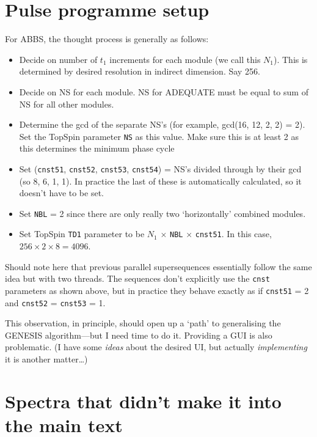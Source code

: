 \documentclass[a4paper,12pt]{article}
\newcommand{\todo}[1]{{\color{OrangeRed}#1}}
\begin{document}
\begin{refsection}
\startcontents[si]
\vfill
\hspace{0pt}
\newpage

\section{Pulse programme setup}

For ABBS, the thought process is generally as follows:

\begin{itemize}
    \item Decide on number of $t_1$ increments for each module (we call this $N_1$). This is determined by desired resolution in indirect dimension. Say 256.
    \item Decide on NS for each module. NS for ADEQUATE must be equal to sum of NS for all other modules.
    \item Determine the gcd of the separate NS's (for example, gcd(16, 12, 2, 2) = 2). Set the TopSpin parameter \texttt{NS} as this value. Make sure this is at least 2 as this determines the minimum phase cycle
    \item Set (\texttt{cnst51}, \texttt{cnst52}, \texttt{cnst53}, \texttt{cnst54}) = NS's divided through by their gcd (so 8, 6, 1, 1). In practice the last of these is automatically calculated, so it doesn't have to be set.
    \item Set \texttt{NBL} = 2 since there are only really two `horizontally' combined modules.
    \item Set TopSpin \texttt{TD1} parameter to be $N_1$ $\times$ \texttt{NBL} $\times$ \texttt{cnst51}. In this case, $256 \times 2 \times 8 = 4096$.
\end{itemize}

\todo{
    Should note here that previous parallel supersequences\autocite{Kupce2021JACSA} essentially follow the same idea but with two threads.
    The sequences don't explicitly use the \texttt{cnst} parameters as shown above, but in practice they behave exactly as if \texttt{cnst51} = 2 and \texttt{cnst52} = \texttt{cnst53} = 1.

    This observation, in principle, should open up a `path' to generalising the GENESIS algorithm---but I need time to do it.
    Providing a GUI is also problematic.
    (I have some \textit{ideas} about the desired UI, but actually \textit{implementing} it is another matter\ldots{})
}



\section{Spectra that didn't make it into the main text}


\end{refsection}
\end{document}
